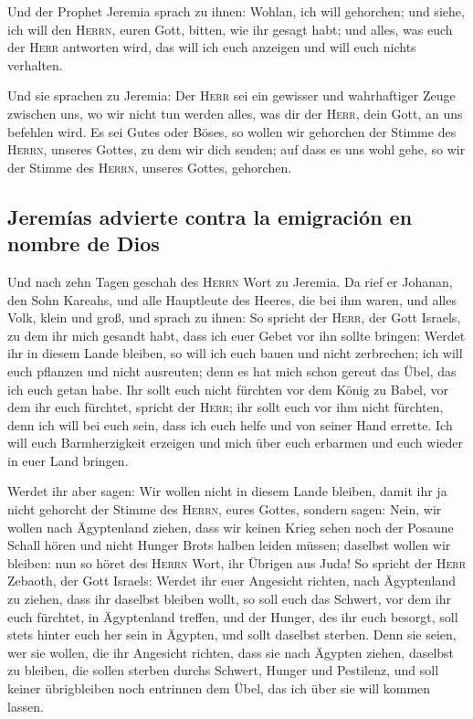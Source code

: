  Und der Prophet Jeremia sprach zu ihnen: Wohlan, ich will
gehorchen; und siehe, ich will den \textsc{Herrn}, euren Gott, bitten,
wie ihr gesagt habt; und alles, was euch der \textsc{Herr} antworten
wird, das will ich euch anzeigen und will euch nichts verhalten.

 Und sie sprachen zu Jeremia: Der \textsc{Herr} sei ein
gewisser und wahrhaftiger Zeuge zwischen uns, wo wir nicht tun werden
alles, was dir der \textsc{Herr}, dein Gott, an uns befehlen wird.
 Es sei Gutes oder Böses, so wollen wir gehorchen der
Stimme des \textsc{Herrn}, unseres Gottes, zu dem wir dich senden; auf
dass es uns wohl gehe, so wir der Stimme des \textsc{Herrn}, unseres
Gottes, gehorchen.

\hypertarget{jeremuxedas-advierte-contra-la-emigraciuxf3n-en-nombre-de-dios}{%
\subsection{Jeremías advierte contra la emigración en nombre de
Dios}\label{jeremuxedas-advierte-contra-la-emigraciuxf3n-en-nombre-de-dios}}

 Und nach zehn Tagen geschah des \textsc{Herrn} Wort zu
Jeremia.  Da rief er Johanan, den Sohn Kareahs, und alle
Hauptleute des Heeres, die bei ihm waren, und alles Volk, klein und
groß,  und sprach zu ihnen: So spricht der \textsc{Herr},
der Gott Israels, zu dem ihr mich gesandt habt, dass ich euer Gebet vor
ihn sollte bringen:  Werdet ihr in diesem Lande bleiben,
so will ich euch bauen und nicht zerbrechen; ich will euch pflanzen und
nicht ausreuten; denn es hat mich schon gereut das Übel, das ich euch
getan habe.  Ihr sollt euch nicht fürchten vor dem König
zu Babel, vor dem ihr euch fürchtet, spricht der \textsc{Herr}; ihr
sollt euch vor ihm nicht fürchten, denn ich will bei euch sein, dass ich
euch helfe und von seiner Hand errette.  Ich will euch
Barmherzigkeit erzeigen und mich über euch erbarmen und euch wieder in
euer Land bringen.

 Werdet ihr aber sagen: Wir wollen nicht in diesem Lande
bleiben, damit ihr ja nicht gehorcht der Stimme des \textsc{Herrn},
eures Gottes,  sondern sagen: Nein, wir wollen nach
Ägyptenland ziehen, dass wir keinen Krieg sehen noch der Posaune Schall
hören und nicht Hunger Brots halben leiden müssen; daselbst wollen wir
bleiben:  nun so höret des \textsc{Herrn} Wort, ihr
Übrigen aus Juda! So spricht der \textsc{Herr} Zebaoth, der Gott
Israels: Werdet ihr euer Angesicht richten, nach Ägyptenland zu ziehen,
dass ihr daselbst bleiben wollt,  so soll euch das
Schwert, vor dem ihr euch fürchtet, in Ägyptenland treffen, und der
Hunger, des ihr euch besorgt, soll stets hinter euch her sein in
Ägypten, und sollt daselbst sterben.  Denn sie seien, wer
sie wollen, die ihr Angesicht richten, dass sie nach Ägypten ziehen,
daselbst zu bleiben, die sollen sterben durchs Schwert, Hunger und
Pestilenz, und soll keiner übrigbleiben noch entrinnen dem Übel, das ich
über sie will kommen lassen.

